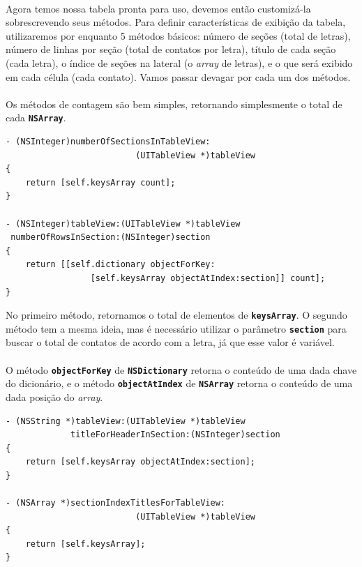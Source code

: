 \documentclass[a4paper,12pt,brazil,doubleside]{book}
\begin{document}
\paragraph{}Agora temos nossa tabela pronta para uso, devemos então customizá-la sobrescrevendo seus métodos. Para definir características de exibição da tabela, utilizaremos por enquanto 5 métodos básicos: número de seções (total de letras), número de linhas por seção (total de contatos por letra), título de cada seção (cada letra), o índice de seções na lateral (o \emph{array} de letras), e o que será exibido em cada célula (cada contato). Vamos passar devagar por cada um dos métodos.

\pagebreak

\paragraph{}Os métodos de contagem são bem simples, retornando simplesmente o total de cada \texttt{\textbf{NSArray}}.

\begin{listing}
\begin{verbatim}
- (NSInteger)numberOfSectionsInTableView:
                          (UITableView *)tableView
{
    return [self.keysArray count];
}

- (NSInteger)tableView:(UITableView *)tableView
 numberOfRowsInSection:(NSInteger)section
{
    return [[self.dictionary objectForKey:
                 [self.keysArray objectAtIndex:section]] count];
}
\end{verbatim}
\end{listing}

No primeiro método, retornamos o total de elementos de \texttt{\textbf{keysArray}}. O segundo método tem a mesma ideia, mas é necessário utilizar o parâmetro \texttt{\textbf{section}} para buscar o total de contatos de acordo com a letra, já que esse valor é variável.
\paragraph{}O método \texttt{\textbf{objectForKey}} de \texttt{\textbf{NSDictionary}} retorna o conteúdo de uma dada chave do dicionário, e o método \texttt{\textbf{objectAtIndex}} de \texttt{\textbf{NSArray}} retorna o conteúdo de uma dada posição do \emph{array}.

\begin{listing}
\begin{verbatim}
- (NSString *)tableView:(UITableView *)tableView
             titleForHeaderInSection:(NSInteger)section
{
    return [self.keysArray objectAtIndex:section];
}

- (NSArray *)sectionIndexTitlesForTableView:
                          (UITableView *)tableView
{    
    return [self.keysArray];
}
\end{verbatim}
\end{listing}
\end{document}
